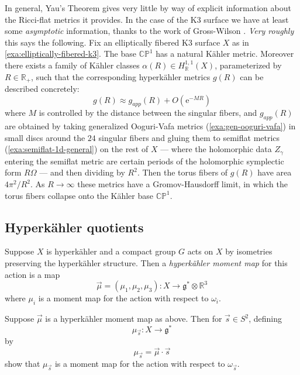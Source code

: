 \documentclass[12pt,letterpaper,reqno]{article}
\numberwithin{equation}{section}
\newcommand{\fg}{{\mathfrak g}}
\newcommand{\R}{\ensuremath{\mathbb R}}
\newcommand{\C}{\ensuremath{\mathbb C}}
\newcommand{\PP}{\ensuremath{\mathbb P}}
\newcommand{\kahler}{K\"ahler\xspace}
\newcommand{\hk}{hyperk\"ahler\xspace}
\newcommand{\Hk}{Hyperk\"ahler\xspace}
\newcommand{\e}{{\mathrm e}}
\newcommand{\ti}[1]{\textit{#1}}
\begin{document}
In general, Yau's Theorem gives very little by way of explicit information
about the Ricci-flat metrics it provides. In the case of the K3 surface
we have at least some \ti{asymptotic} information, thanks to the work
of Gross-Wilson \cite{MR1863732}.
\ti{Very roughly} this says the following.
Fix an elliptically fibered K3 surface $X$ as in
\autoref{exa:elliptically-fibered-k3}. The base $\C\PP^1$
has a natural \kahler metric.
Moreover there exists a family
of \kahler classes $\alpha(R) \in H^{1,1}_\R(X)$,
parameterized by $R \in \R_+$, such that the corresponding \hk metrics
$g(R)$ can be described concretely:
\begin{equation}
    g(R) \approx g_{app}(R) + O(\e^{-M R})
\end{equation}
where $M$ is controlled by the distance between the singular fibers,
and $g_{app}(R)$ are obtained by
taking generalized Ooguri-Vafa metrics (\autoref{exa:gen-ooguri-vafa})
in small discs around the $24$ singular fibers and gluing them to
semiflat metrics (\autoref{exa:semiflat-1d-general})
on the rest of $X$ --- where the holomorphic data $Z_\gamma$ entering
the semiflat metric
are certain periods of the holomorphic symplectic form
$R \Omega$ --- and then dividing by $R^2$.
Then the torus fibers of $g(R)$ have
area $4 \pi^2 / R^2$. As $R \to \infty$ these metrics
have a Gromov-Hausdorff limit,
in which the torus fibers collapse onto the \kahler base $\C\PP^1$.



\subsection{\Hk quotients}

\begin{defn}[\Hk moment map] Suppose $X$ is \hk and a compact group
$G$ acts on $X$ by isometries preserving the \hk structure.
Then a \ti{\hk moment map} for this action is a map
\begin{equation}
  \vec\mu = (\mu_1, \mu_2, \mu_3): X \to \fg^* \otimes \R^3
\end{equation}
where $\mu_i$ is a moment map for the action with respect
to $\omega_i$.
\end{defn}

\begin{exercise} Suppose $\vec\mu$ is a \hk moment map as above.
Then for $\vec s \in S^2$, defining
\begin{equation}
  \mu_{\vec s}: X \to \fg^*
\end{equation}
by
\begin{equation}
  \mu_{\vec s} = \vec\mu \cdot \vec s
\end{equation}
show that $\mu_{\vec s}$ is a moment map for the action
with respect to $\omega_{\vec s}$.
\end{exercise}
\end{document}
